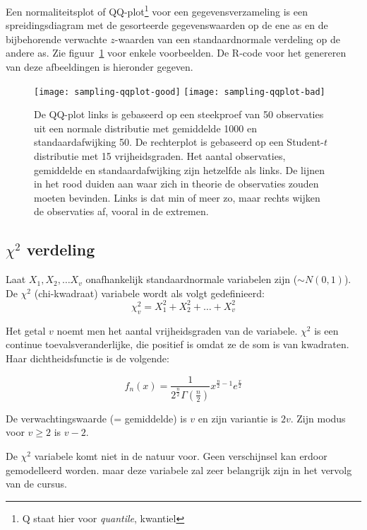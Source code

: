 {\begin{definition}
  \label{def:qq-plot}
  Een normaliteitsplot of QQ-plot\footnote{Q staat hier voor \emph{quantile}, kwantiel} voor een gegevens\-verzameling is een spreidingsdiagram met de gesorteerde gegevenswaarden op de ene as en de bijbehorende verwachte $z$-waarden van een standaardnormale verdeling op de andere as. Zie figuur~\ref{fig:qqplot} voor enkele voorbeelden. De R-code voor het genereren van deze afbeeldingen is hieronder gegeven.
\end{definition}

\begin{figure}
  \begin{center}
    \texttt{[image: sampling-qqplot-good]}
    \texttt{[image: sampling-qqplot-bad]}
  \end{center}
  \caption{De QQ-plot links is gebaseerd op een steekproef van 50 observaties uit een normale distributie met gemiddelde 1000 en standaardafwijking 50. De rechterplot is gebaseerd op een Student-$t$ distributie met 15 vrijheidsgraden. Het aantal observaties, gemiddelde en standaardafwijking zijn hetzelfde als links.
    De lijnen in het rood duiden aan waar zich in theorie de observaties zouden moeten bevinden. Links is dat min of meer zo, maar rechts wijken de observaties af, vooral in de extremen.}
  \label{fig:qqplot}
\end{figure}



\subsection[Chi-kwadraatverdeling]{$\chi^{2}$ verdeling}
Laat $X_{1}, X_{2}, \dots X_{v}$ onafhankelijk standaardnormale variabelen zijn ($\sim N(0,1)$). De $\chi^{2}$ (chi-kwadraat) variabele wordt als volgt gedefinieerd:
\[ \chi^{2}_{v} = X_{1}^{2} + X_{2}^{2} + \dots + X_{v}^{2} \]

Het getal $v$ noemt men het aantal vrijheidsgraden van de variabele. $\chi^{2}$ is een continue toevalsveranderlijke, die positief is omdat ze de som is van kwadraten. Haar dichtheidsfunctie is de volgende:

\[ f_{n}(x) = \frac{1}{2^{\frac{n}{2}}\Gamma(\frac{n}{2})} x^{\frac{n}{2} -1} e^{\frac{x}{2}} \]

De verwachtingswaarde (= gemiddelde) is $v$ en zijn variantie is $2v$. Zijn modus voor $v \geq 2$ is $v-2$.

De $\chi^{2}$ variabele komt niet in de natuur voor. Geen verschijnsel kan erdoor gemodelleerd worden. maar deze variabele zal zeer belangrijk zijn in het vervolg van de cursus.

}
